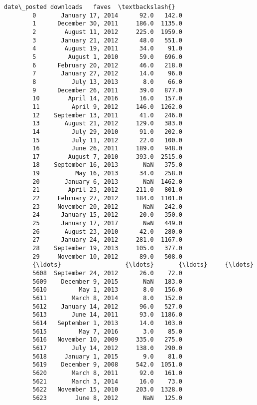 \documentclass[11pt]{article}
\begin{document}
\begin{Verbatim}[commandchars=\\\{\}]
                     date\_posted downloads   faves  \textbackslash{}
        0       January 17, 2014      92.0   142.0   
        1      December 30, 2011     186.0  1135.0   
        2        August 11, 2012     225.0  1959.0   
        3       January 21, 2012      48.0   551.0   
        4        August 19, 2011      34.0    91.0   
        5         August 1, 2010      59.0   696.0   
        6      February 20, 2012      46.0   218.0   
        7       January 27, 2012      14.0    96.0   
        8          July 13, 2013       8.0    66.0   
        9      December 26, 2011      39.0   877.0   
        10        April 14, 2016      16.0   157.0   
        11         April 9, 2012     146.0  1262.0   
        12    September 13, 2011      41.0   246.0   
        13       August 21, 2012     129.0   383.0   
        14         July 29, 2010      91.0   202.0   
        15         July 11, 2012      22.0   100.0   
        16         June 26, 2011     189.0   948.0   
        17        August 7, 2010     393.0  2515.0   
        18    September 16, 2013       NaN   375.0   
        19          May 16, 2013      34.0   258.0   
        20       January 6, 2013       NaN  1462.0   
        21        April 23, 2012     211.0   801.0   
        22     February 27, 2012     184.0  1101.0   
        23     November 20, 2012       NaN   242.0   
        24      January 15, 2012      20.0   350.0   
        25      January 17, 2017       NaN   449.0   
        26       August 23, 2010      42.0   280.0   
        27      January 24, 2012     281.0  1167.0   
        28    September 19, 2013     105.0   377.0   
        29     November 10, 2012      89.0   508.0   
        {\ldots}                  {\ldots}       {\ldots}     {\ldots}   
        5608  September 24, 2012      26.0    72.0   
        5609    December 9, 2015       NaN   183.0   
        5610         May 1, 2013       8.0   156.0   
        5611       March 8, 2014       8.0   152.0   
        5612    January 14, 2012      96.0   527.0   
        5613       June 14, 2011      93.0  1186.0   
        5614   September 1, 2013      14.0   103.0   
        5615         May 7, 2016       3.0    85.0   
        5616   November 10, 2009     335.0   275.0   
        5617       July 14, 2012     138.0   290.0   
        5618     January 1, 2015       9.0    81.0   
        5619    December 9, 2008     542.0  1051.0   
        5620       March 8, 2011      92.0   161.0   
        5621       March 3, 2014      16.0    73.0   
        5622   November 15, 2010     203.0  1328.0   
        5623        June 8, 2012       NaN   125.0   

\end{Verbatim}
\end{document}

